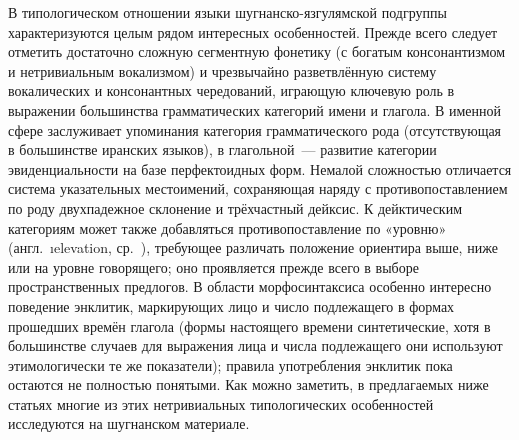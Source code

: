 В типологическом отношении языки шугнанско-язгулямской подгруппы характеризуются целым рядом интересных особенностей. Прежде всего следует отметить достаточно сложную сегментную фонетику (с богатым консонантизмом и нетривиальным вокализмом) и чрезвычайно разветвлённую систему вокалических и консонантных чередований, играющую ключевую роль в выражении большинства грамматических категорий имени и глагола. В именной сфере заслуживает упоминания категория грамматического рода (отсутствующая в большинстве иранских языков), в глагольной~— развитие категории эвиденциальности на базе перфектоидных форм. Немалой сложностью отличается система указательных местоимений, сохраняющая наряду с противопоставлением по роду двухпадежное склонение \parencites{payne1989}{arkadiev2006} и трёхчастный дейксис. К дейктическим категориям может также добавляться противопоставление по «уровню» (англ.~\i{elevation}, ср.~\parencite{forker2019}), требующее различать положение ориентира выше, ниже или на уровне говорящего; оно проявляется прежде всего в выборе пространственных предлогов. В области морфосинтаксиса особенно интересно поведение энклитик, маркирующих лицо и число подлежащего в формах прошедших времён глагола (формы настоящего времени синтетические, хотя в большинстве случаев для выражения лица и числа подлежащего они используют этимологически те же показатели); правила употребления энклитик пока остаются не полностью понятыми. Как можно заметить, в предлагаемых ниже статьях многие из этих нетривиальных типологических особенностей исследуются на шугнанском материале.

